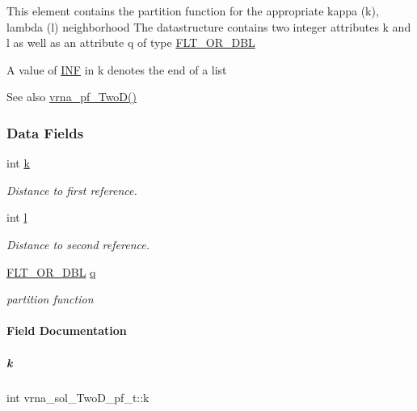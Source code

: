 This element contains the partition function for the appropriate kappa (k), lambda (l) neighborhood The datastructure contains two integer attributes \textquotesingle{}k\textquotesingle{} and \textquotesingle{}l\textquotesingle{} as well as an attribute \textquotesingle{}q\textquotesingle{} of type \mbox{\hyperlink{group__data__structures_ga31125aeace516926bf7f251f759b6126}{F\+L\+T\+\_\+\+O\+R\+\_\+\+D\+BL}}

A value of \mbox{\hyperlink{energy__const_8h_a12c2040f25d8e3a7b9e1c2024c618cb6}{I\+NF}} in k denotes the end of a list

\begin{DoxySeeAlso}{See also}
\mbox{\hyperlink{group__kl__neighborhood__pf_ga0bc3427689bd09da09b8b3094a27f836}{vrna\+\_\+pf\+\_\+\+Two\+D()}} 
\end{DoxySeeAlso}
\subsubsection*{Data Fields}
\begin{DoxyCompactItemize}
\item 
int \mbox{\hyperlink{group__kl__neighborhood__pf_ad1f23b46dc4ebd373abdeb0382d87b83}{k}}
\begin{DoxyCompactList}\small\item\em Distance to first reference. \end{DoxyCompactList}\item 
int \mbox{\hyperlink{group__kl__neighborhood__pf_a01133c264eff2c988d144e07803d1b8b}{l}}
\begin{DoxyCompactList}\small\item\em Distance to second reference. \end{DoxyCompactList}\item 
\mbox{\hyperlink{group__data__structures_ga31125aeace516926bf7f251f759b6126}{F\+L\+T\+\_\+\+O\+R\+\_\+\+D\+BL}} \mbox{\hyperlink{group__kl__neighborhood__pf_a17ebbf425b8769ded74b5c7b85e58ee1}{q}}
\begin{DoxyCompactList}\small\item\em partition function \end{DoxyCompactList}\end{DoxyCompactItemize}


\paragraph{Field Documentation}
\mbox{\label{group__kl__neighborhood__pf_ad1f23b46dc4ebd373abdeb0382d87b83}} 
\subparagraph{\texorpdfstring{k}{k}}
{\footnotesize\ttfamily int vrna\+\_\+sol\+\_\+\+Two\+D\+\_\+pf\+\_\+t\+::k}



